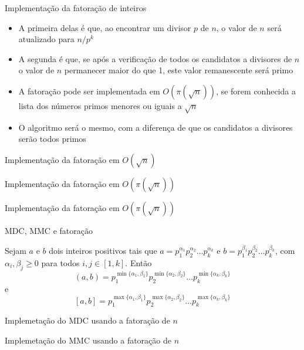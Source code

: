 \begin{frame}[fragile]{Implementação da fatoração de inteiros}

    \begin{itemize}
        \item A primeira delas é que, ao encontrar um divisor $p$ de $n$, o valor de $n$ será 
            atualizado para $n/p^k$

        \item A segunda é que, se após a verificação de todos os candidatos a divisores de $n$
            o valor de $n$ permanecer maior do que 1, este valor remanescente será primo


        \item A fatoração pode ser implementada em $O(\pi(\sqrt{n}))$, se forem conhecida a
            lista dos números primos menores ou iguais a $\sqrt{n}$

        \item O algoritmo será o mesmo, com a diferença de que os candidatos a divisores serão
            todos primos
    \end{itemize}

\end{frame}

\begin{frame}[fragile]{Implementação da fatoração em $O(\sqrt{n})$}
\end{frame}

\begin{frame}[fragile]{Implementação da fatoração em $O(\pi(\sqrt{n}))$}
\end{frame}

\begin{frame}[fragile]{Implementação da fatoração em $O(\pi(\sqrt{n}))$}
\end{frame}

\begin{frame}[fragile]{MDC, MMC e fatoração}

Sejam $a$ e $b$ dois inteiros positivos tais que $a = p_1^{\alpha_1}p_2^{\alpha_2}\ldots p_k^{\alpha_k}$ e $b = p_1^{\beta_1}p_2^{\beta_2}\ldots p_k^{\beta_k}$, com $\alpha_i, \beta_j \geq 0$ para todos $i, j\in [1,k]$. Então
$$
    (a, b) = p_1^{\min\{\alpha_1, \beta_1\}}p_2^{\min\{\alpha_2, \beta_2\}}\ldots p_k^{\min\{\alpha_k, \beta_k\}}
$$
e
$$
    [a, b] = p_1^{\max\{\alpha_1, \beta_1\}}p_2^{\max\{\alpha_2, \beta_2\}}\ldots p_k^{\max\{\alpha_k, \beta_k\}}
$$

\end{frame}

\begin{frame}[fragile]{Implemetação do MDC usando a fatoração de $n$}
\end{frame}

\begin{frame}[fragile]{Implemetação do MMC usando a fatoração de $n$}
\end{frame}
